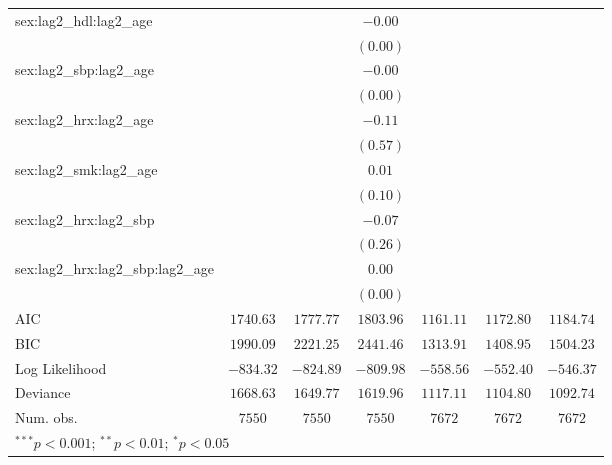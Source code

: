 \begin{tabular}{l c c c c c c}
sex:lag2\_hdl:lag2\_age           &              &            & $-0.00$    &                &                &                \\
                                  &              &            & $(0.00)$   &                &                &                \\
sex:lag2\_sbp:lag2\_age           &              &            & $-0.00$    &                &                &                \\
                                  &              &            & $(0.00)$   &                &                &                \\
sex:lag2\_hrx:lag2\_age           &              &            & $-0.11$    &                &                &                \\
                                  &              &            & $(0.57)$   &                &                &                \\
sex:lag2\_smk:lag2\_age           &              &            & $0.01$     &                &                &                \\
                                  &              &            & $(0.10)$   &                &                &                \\
sex:lag2\_hrx:lag2\_sbp           &              &            & $-0.07$    &                &                &                \\
                                  &              &            & $(0.26)$   &                &                &                \\
sex:lag2\_hrx:lag2\_sbp:lag2\_age &              &            & $0.00$     &                &                &                \\
                                  &              &            & $(0.00)$   &                &                &                \\
\midrule
AIC                               & $1740.63$    & $1777.77$  & $1803.96$  & $1161.11$      & $1172.80$      & $1184.74$      \\
BIC                               & $1990.09$    & $2221.25$  & $2441.46$  & $1313.91$      & $1408.95$      & $1504.23$      \\
Log Likelihood                    & $-834.32$    & $-824.89$  & $-809.98$  & $-558.56$      & $-552.40$      & $-546.37$      \\
Deviance                          & $1668.63$    & $1649.77$  & $1619.96$  & $1117.11$      & $1104.80$      & $1092.74$      \\
Num. obs.                         & $7550$       & $7550$     & $7550$     & $7672$         & $7672$         & $7672$         \\
\bottomrule
\multicolumn{7}{l}{\scriptsize{$^{***}p<0.001$; $^{**}p<0.01$; $^{*}p<0.05$}}
\end{tabular}
